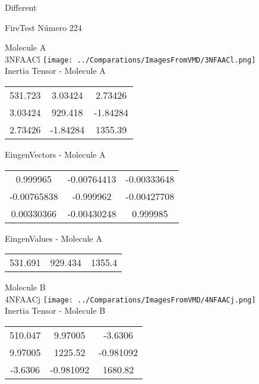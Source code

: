 \begin{center}
\vtab
\vtab
\textcolor{NavyBlue}{\Large Different}
\end{center}

 \newpage

\vtab[-2cm]
\begin{center}
{\large FireTest \tab Número 224}
\end{center}
\begin{multicols}{2}
\begin{center}

Molecule A \\ 
3NFAACl
\texttt{[image: ../Comparations/ImagesFromVMD/3NFAACl.png]}
\\
Inertia Tensor - Molecule A \\
\vtab

\begin{tabular}{|c c c|}
531.723	 & 	3.03424	 & 	2.73426	 \\
3.03424	 & 	929.418	 & 	-1.84284	 \\
2.73426	 & 	-1.84284	 & 	1355.39
\end{tabular}

\vtab
 EingenVectors - Molecule A     \\
\vtab
\begin{tabular}{|c c c|}
0.999965	 & 	-0.00764413	 & 	-0.00333648	 \\
-0.00765838	 & 	-0.999962	 & 	-0.00427708	 \\
0.00330366	 & 	-0.00430248	 & 	0.999985
\end{tabular}

\vtab
 EingenValues - Molecule A     \\
\vtab
\begin{tabular}{|c c c|}
531.691	 & 	929.434	 & 	1355.4	 \\
\end{tabular}
\columnbreak

Molecule B \\ 
4NFAACj
\texttt{[image: ../Comparations/ImagesFromVMD/4NFAACj.png]}
\\
Inertia Tensor - Molecule B \\
\vtab

\begin{tabular}{|c c c|}
510.047	 & 	9.97005	 & 	-3.6306	 \\
9.97005	 & 	1225.52	 & 	-0.981092	 \\
-3.6306	 & 	-0.981092	 & 	1680.82
\end{tabular}


\end{center}
\end{multicols}
